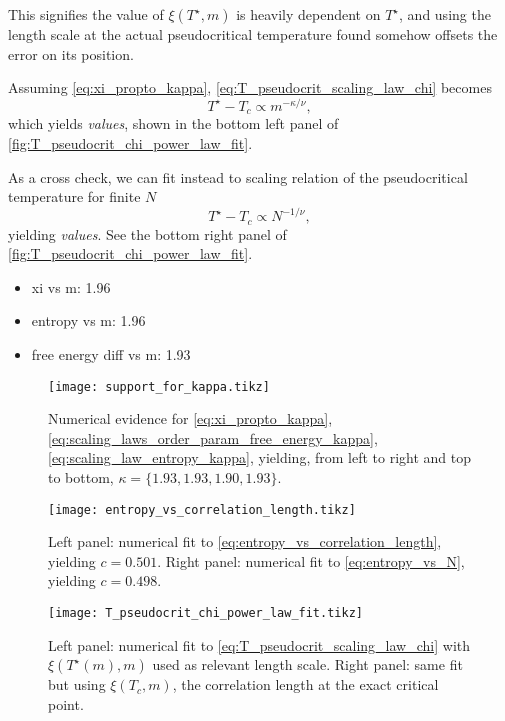 This signifies the value of $\xi(T^{\star}, m)$ is heavily dependent on
$T^{\star}$, and using the length scale at the actual pseudocritical temperature found somehow offsets the error on its
position.

Assuming \autoref{eq:xi_propto_kappa}, \autoref{eq:T_pseudocrit_scaling_law_chi} becomes
\begin{equation}
  T^{\star} - T_c \propto m^{-\kappa / \nu},
\end{equation}
which yields \emph{values}, shown in the bottom left panel of \autoref{fig:T_pseudocrit_chi_power_law_fit}.

As a cross check, we can fit instead to scaling relation of the pseudocritical temperature for finite $N$
\begin{equation}
  T^{\star} - T_c \propto N^{-1/\nu},
\end{equation}
yielding \emph{values}. See the bottom right panel of \autoref{fig:T_pseudocrit_chi_power_law_fit}.


\begin{itemize}
  \item xi vs m: 1.96
  \item entropy vs m: 1.96
  \item free energy diff vs m: 1.93
\end{itemize}


\begin{figure}
  \texttt{[image: support\_for\_kappa.tikz]}
  \caption{Numerical evidence for \autoref{eq:xi_propto_kappa}, \autoref{eq:scaling_laws_order_param_free_energy_kappa},
  \autoref{eq:scaling_law_entropy_kappa}, yielding, from left to right and top to bottom, $\kappa = \{ 1.93, 1.93, 1.90,
  1.93 \}$.}\label{fig:support_for_kappa}
\end{figure}

\begin{figure}
  \texttt{[image: entropy\_vs\_correlation\_length.tikz]}
  \caption{Left panel: numerical fit to \autoref{eq:entropy_vs_correlation_length}, yielding $c = 0.501$. Right panel:
  numerical fit to \autoref{eq:entropy_vs_N}, yielding $c = 0.498$. }\label{fig:entropy_vs_correlation_length}
\end{figure}

\begin{figure}
  \texttt{[image: T\_pseudocrit\_chi\_power\_law\_fit.tikz]}
  \caption{Left panel: numerical fit to \autoref{eq:T_pseudocrit_scaling_law_chi} with $\xi(T^{\star}(m), m)$ used as
  relevant length scale. Right panel: same fit but using $\xi(T_c, m)$, the correlation length at the exact critical
  point.}\label{fig:T_pseudocrit_chi_power_law_fit}
\end{figure}

